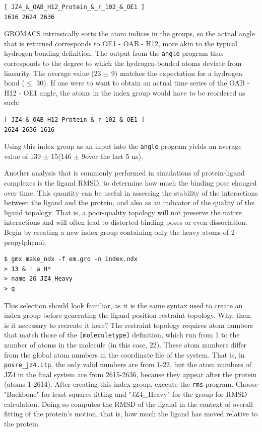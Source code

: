 \documentclass[9pt,tutorial,pubversion]{livecoms}
\begin{document}
\begin{lstlisting}
[ JZ4_&_OAB_H12_Protein_&_r_102_&_OE1 ]
1616 2624 2636
\end{lstlisting}

GROMACS intrinsically sorts the atom indices in the groups, so the actual angle that is returned corresponds to OE1 - OAB - H12, more akin to the typical hydrogen bonding definition. The output from the \texttt{angle} program thus corresponds to the degree to which the hydrogen-bonded atoms deviate from linearity. The average value (23 $\pm$ 9\textdegree) matches the expectation for a hydrogen bond ($\le$ 30\textdegree). If one were to want to obtain an actual time series of the OAB - H12 - OE1 angle, the atoms in the index group would have to be reordered as such:

\begin{lstlisting}
[ JZ4_&_OAB_H12_Protein_&_r_102_&_OE1 ]
2624 2636 1616
\end{lstlisting}
%
Using this index group as an input into the \texttt{angle} program yields an average value of 139 $\pm$ 15\textdegree (146 $\pm$ 9\textdegree over the last 5 ns).

Another analysis that is commonly performed in simulations of protein-ligand complexes is the ligand RMSD, to determine how much the binding pose changed over time. This quantity can be useful in assessing the stability of the interactions between the ligand and the protein, and also as an indicator of the quality of the ligand topology. That is, a poor-quality topology will not preserve the native interactions and will often lead to distorted binding poses or even dissociation. Begin by creating a new index group containing only the heavy atoms of 2-propylphenol:

\begin{lstlisting}
$ gmx make_ndx -f em.gro -n index.ndx
> 13 & ! a H*
> name 26 JZ4_Heavy
> q
\end{lstlisting}
%
This selection should look familiar, as it is the same syntax used to create an index group before generating the ligand position restraint topology. Why, then, is it necessary to recreate it here? The restraint topology requires atom numbers that match those of the \texttt{[moleculetype]} definition, which run from 1 to the number of atoms in the molecule (in this case, 22). These atom numbers differ from the global atom numbers in the coordinate file of the system. That is, in \texttt{posre\_jz4.itp}, the only valid numbers are from 1-22, but the atom numbers of JZ4 in the final system are from 2615-2636, because they appear after the protein (atoms 1-2614). After creating this index group, execute the \texttt{rms} program. Choose "Backbone" for least-squares fitting and "JZ4\_Heavy" for the group for RMSD calculation. Doing so computes the RMSD of the ligand in the context of overall fitting of the protein's motion, that is, how much the ligand has moved relative to the protein.
\end{document}
